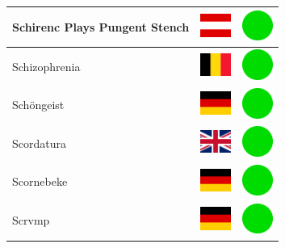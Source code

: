 \documentclass[12pt, a4paper, twoside]{report}
\begin{document}
\begin{center}
\begin{longtable}{|p{5cm}|p{2cm}|p{2cm}|}
Schirenc Plays Pungent Stench & \includegraphics[width=1cm]{4x3/at} & \includegraphics[width=1cm]{likes/y} \\ \hline
Schizophrenia & \includegraphics[width=1cm]{4x3/be} & \includegraphics[width=1cm]{likes/y} \\ \hline
Schöngeist & \includegraphics[width=1cm]{4x3/de} & \includegraphics[width=1cm]{likes/y} \\ \hline
Scordatura & \includegraphics[width=1cm]{4x3/gb} & \includegraphics[width=1cm]{likes/y} \\ \hline
Scornebeke & \includegraphics[width=1cm]{4x3/de} & \includegraphics[width=1cm]{likes/y} \\ \hline
Scrvmp & \includegraphics[width=1cm]{4x3/de} & \includegraphics[width=1cm]{likes/y} \\ \hline

\end{longtable}
\end{center}
\end{document}
